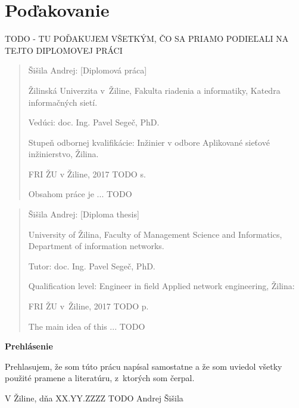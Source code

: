 
\chapter*{Poďakovanie}
\thispagestyle{empty}

\begin{huge}
    TODO - TU POĎAKUJEM VŠETKÝM, ČO SA PRIAMO PODIEĽALI NA TEJTO DIPLOMOVEJ PRÁCI
\end{huge}


\begin{abstract}

\noindent
{\sc Šišila Andrej:} {\em \nazovpraceSK}
[Diplomová práca] 

\noindent
Žilinská Univerzita v~Žiline,  
Fakulta riadenia a informatiky,  
Katedra informačných sietí.

\noindent  
Vedúci: doc. Ing. Pavel Segeč, PhD.
 
\noindent  
Stupeň odbornej kvalifikácie:
Inžinier v odbore Aplikované sieťové inžinierstvo, Žilina. 

\noindent
FRI ŽU v Žiline, 2017 TODO s.

\bigskip

Obsahom práce je ... TODO


\end{abstract}




\begin{abstract}

\noindent
{\sc Šišila Andrej:} {\em \nazovpraceEN}
[Diploma thesis] 

\noindent
University of Žilina,  
Faculty of Management Science and Informatics, 
Department of information networks.
 
\noindent
Tutor:  doc. Ing. Pavel Segeč, PhD.
 
\noindent
Qualification level:
Engineer in field Applied network engineering, Žilina: 

\noindent
FRI ŽU v~Žiline, 2017 TODO p.

\bigskip

The main idea of this ... TODO

\end{abstract}


\newpage

\centerline{\bf Prehlásenie}

\vspace{2em}

\noindent
Prehlasujem, že som túto prácu napísal samostatne a že som uviedol 
všetky použité pramene a literatúru, z~ktorých som čerpal. 

\vspace{2em}

\noindent
V Žiline, dňa XX.YY.ZZZZ TODO
\hfill
Andrej Šišila

